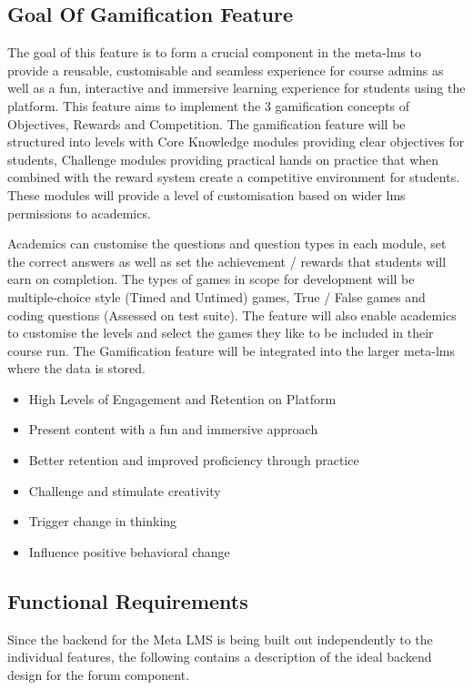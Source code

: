 \newpage

\subsection{Goal Of Gamification Feature}
The goal of this feature is to form a crucial component in the meta-lms to provide a reusable, customisable and seamless experience for course admins as well as a fun, interactive and immersive learning experience for students using the platform. This feature aims to implement the 3 gamification concepts of Objectives, Rewards and Competition. 
The gamification feature will be structured into levels with Core Knowledge modules providing clear objectives for students, Challenge modules providing practical hands on practice that when combined with the reward system create a competitive environment for students. These modules will provide a level of customisation based on wider lms permissions to academics. 
\newline

Academics can customise the questions and question types in each module, set the correct answers as well as set the achievement / rewards that students will earn on completion.
The types of games in scope for development will be multiple-choice style (Timed and Untimed) games, True / False games and coding questions (Assessed on test suite). The feature will also enable academics to customise the levels and select the games they like to be included in their course run. The Gamification feature will be integrated into the larger meta-lms where the data is stored.

\begin{itemize}
    \item High Levels of Engagement and Retention on Platform
    \item Present content with a fun and immersive approach
    \item Better retention and improved proficiency through practice
    \item Challenge and stimulate creativity
    \item Trigger change in thinking
    \item Influence positive behavioral change
\end{itemize}

\newpage


\subsection{Functional Requirements}
Since the backend for the Meta LMS is being built out independently to the individual features, the following contains a description of the ideal backend design for the forum component.

